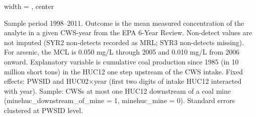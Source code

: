 \begin{table}[htbp]
\begin{adjustbox}{width = \textwidth, center}
      
      
   \end{adjustbox}
      {\tiny\linespread{1}\selectfont \par \raggedright 
   Sample period 1998--2011. Outcome is the mean measured concentration of the analyte in a given CWS-year from the EPA 6-Year Review. Non-detect values are not imputed (SYR2 non-detects recorded as MRL; SYR3 non-detects missing). For arsenic, the MCL is 0.050 mg/L through 2005 and 0.010 mg/L from 2006 onward. Explanatory variable is cumulative coal production since 1985 (in 10 million short tons) in the HUC12 one step upstream of the CWS intake. Fixed effects: PWSID and HUC02$\times$year (first two digits of intake HUC12 interacted with year). Sample: CWSs at most one HUC12 downstream of a coal mine (minehuc\_downstream\_of\_mine = 1, minehuc\_mine = 0). Standard errors clustered at PWSID level.}
   
\end{table}


